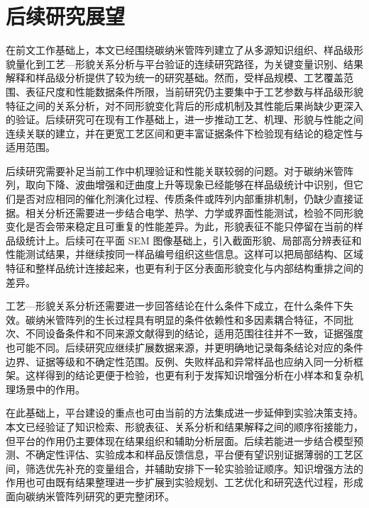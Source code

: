 \section{后续研究展望}

在前文工作基础上，本文已经围绕碳纳米管阵列建立了从多源知识组织、样品级形貌量化到工艺—形貌关系分析与平台验证的连续研究路径，为关键变量识别、结果解释和样品级分析提供了较为统一的研究基础。然而，受样品规模、工艺覆盖范围、表征尺度和性能数据条件所限，当前研究仍主要集中于工艺参数与样品级形貌特征之间的关系分析，对不同形貌变化背后的形成机制及其性能后果尚缺少更深入的验证。后续研究可在现有工作基础上，进一步推动工艺、机理、形貌与性能之间连续关联的建立，并在更宽工艺区间和更丰富证据条件下检验现有结论的稳定性与适用范围。

后续研究需要补足当前工作中机理验证和性能关联较弱的问题。对于碳纳米管阵列，取向下降、波曲增强和迂曲度上升等现象已经能够在样品级统计中识别，但它们是否对应相同的催化剂演化过程、传质条件或阵列内部重排机制，仍缺少直接证据。相关分析还需要进一步结合电学、热学、力学或界面性能测试，检验不同形貌变化是否会带来稳定且可重复的性能差异。为此，形貌表征不能只停留在当前的样品级统计上。后续可在平面 SEM 图像基础上，引入截面形貌、局部高分辨表征和性能测试结果，并继续按同一样品编号组织这些信息。这样可以把局部结构、区域特征和整样品统计连接起来，也更有利于区分表面形貌变化与内部结构重排之间的差异。

工艺—形貌关系分析还需要进一步回答结论在什么条件下成立，在什么条件下失效。碳纳米管阵列的生长过程具有明显的条件依赖性和多因素耦合特征，不同批次、不同设备条件和不同来源文献得到的结论，适用范围往往并不一致，证据强度也可能不同。后续研究应继续扩展数据来源，并更明确地记录每条结论对应的条件边界、证据等级和不确定性范围。反例、失败样品和异常样品也应纳入同一分析框架。这样得到的结论更便于检验，也更有利于发挥知识增强分析在小样本和复杂机理场景中的作用。

在此基础上，平台建设的重点也可由当前的方法集成进一步延伸到实验决策支持。本文已经验证了知识检索、形貌表征、关系分析和结果解释之间的顺序衔接能力，但平台的作用仍主要体现在结果组织和辅助分析层面。后续若能进一步结合模型预测、不确定性评估、实验成本和样品反馈信息，平台便有望识别证据薄弱的工艺区间，筛选优先补充的变量组合，并辅助安排下一轮实验验证顺序。知识增强方法的作用也可由既有结果整理进一步扩展到实验规划、工艺优化和研究迭代过程，形成面向碳纳米管阵列研究的更完整闭环。

